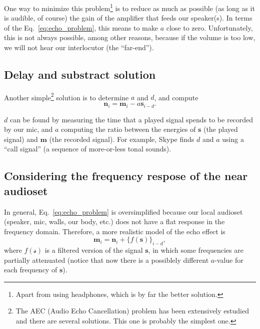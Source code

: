 One way to minimize this problem\footnote{Apart from using headphones,
  which is by far the better solution.} is to reduce as much as
possible (as long as it is audible, of course) the gain of the
amplifier that feeds our speaker(s). In terms of the
Eq.~\eqref{eq:echo_problem}, this means to make $a$ close to
zero. Unfortunately, this is not always possible, among other reasons,
because if the volume is too low, we will not hear our interlocutor
(the ``far-end'').

\subsection{Delay and substract solution}

Another simple\footnote{The AEC (Audio Echo Cancellation) problem has
  been extensively estudied and there are several solutions. This one
  is probably the simplest one.} solution is to determine $a$ and $d$,
and compute
\begin{equation}
  {\mathbf n}_i = {\mathbf m}_i - a{\mathbf s}_{i-d}.
  \label{eq:echo_cancellation}
\end{equation}

$d$ can be found by measuring the time that a played signal spends to
be recorded by our mic, and $a$ computing the ratio between the
energies of ${\mathbf s}$ (the played signal) and ${\mathbf m}$ (the
recorded signal). For example, Skype finds $d$ and $a$ using a ``call
signal'' (a sequence of more-or-less tonal sounds).

\subsection{Considering the frequency respose of the near audioset}

In general, Eq.~\eqref{eq:echo_problem} is oversimplified because our
local audioset (speaker, mic, walls, our body, etc.) does not have a
flat response in the frequency domain. Therefore, a more realistic
model of the echo effect is
\begin{equation}
   {\mathbf m}_i = {\mathbf n}_i + \{f({\mathbf s})\}_{i-d},
  \label{eq:more_realistic_echo_problem}
\end{equation}
where $f({\mathcal s})$ is a filtered version of the signal
${\mathbf s}$, in which some frequencies are partially attenuated
(notice that now there is a possiblely different $a$-value for each
frequency of ${\mathbf s}$).

